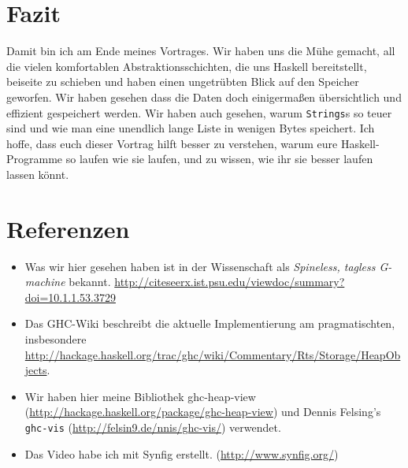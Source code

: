 \documentclass[11pt,DIV=12,parskip=half,headings=normal,abstract]{scrartcl}
\newcommand{\li}{\lstinline[style=haskell]}
\begin{document}
\begin{center}
\end{center}


\section{Fazit}

Damit bin ich am Ende meines Vortrages. Wir haben uns die Mühe gemacht, all die vielen komfortablen Abstraktionsschichten, die uns Haskell bereitstellt, beiseite zu schieben und haben einen ungetrübten Blick auf den Speicher geworfen. Wir haben gesehen dass die Daten doch einigermaßen übersichtlich und effizient gespeichert werden. Wir haben auch gesehen, warum \li-Strings-s so teuer sind und wie man eine unendlich lange Liste in wenigen Bytes speichert. Ich hoffe, dass euch dieser Vortrag hilft besser zu verstehen, warum eure Haskell-Programme so laufen wie sie laufen, und zu wissen, wie ihr sie besser laufen lassen könnt.

\section{Referenzen}

\begin{itemize}
\item Was wir hier gesehen haben ist in der Wissenschaft als \emph{Spineless, tagless G-machine} bekannt. \url{http://citeseerx.ist.psu.edu/viewdoc/summary?doi=10.1.1.53.3729}
\item Das GHC-Wiki beschreibt die aktuelle Implementierung am pragmatischten, insbesondere \url{http://hackage.haskell.org/trac/ghc/wiki/Commentary/Rts/Storage/HeapObjects}.
\item Wir haben hier meine Bibliothek ghc-heap-view (\url{http://hackage.haskell.org/package/ghc-heap-view}) und Dennis Felsing’s \li!ghc-vis! (\url{http://felsin9.de/nnis/ghc-vis/}) verwendet.
\item Das Video habe ich mit Synfig erstellt. (\url{http://www.synfig.org/})
\end{itemize}
\end{document}
